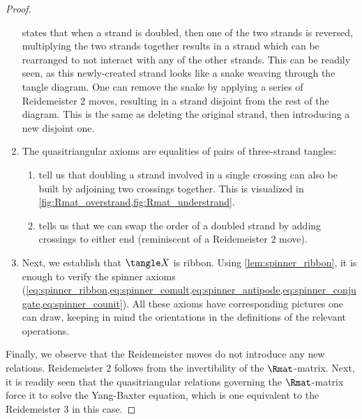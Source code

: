 \begin{proof}
\begin{enumerate}
                         states that when a strand is
                        doubled, then one of the two strands is reversed,
                        multiplying the two strands together results in a strand
                        which can be rearranged to not interact with any of the
                        other strands. This can be readily seen, as this
                        newly-created strand looks like a snake weaving through
                        the tangle diagram. One can remove the snake by applying
                        a series of Reidemeister 2 moves, resulting in a strand
                        disjoint from the rest of the diagram. This is the same
                        as deleting the original strand, then introducing a new
                        disjoint one.
                \item The quasitriangular axioms are equalities of pairs of
                        three-strand tangles:
                        \begin{enumerate}
                                \item {}
                                        tell us that doubling a strand involved
                                        in a single crossing can also be built
                                        by adjoining two crossings together.
                                        This is visualized in
                                        \cref{fig:Rmat_overstrand,fig:Rmat_understrand}.
                                \item {} tells us that we can
                                        swap the order of a doubled strand by
                                        adding crossings to either end
                                        (reminiscent of a Reidemeister 2 move).
                        \end{enumerate}
                \item Next, we establish that $\tangle X$ is ribbon. Using
                        \cref{lem:spinner_ribbon}, it is enough to verify the
                        spinner axioms
                        (\cref{eq:spinner_ribbon,eq:spinner_comult,eq:spinner_antipode,eq:spinner_conjugate,eq:spinner_counit}).
                        All these axioms have corresponding pictures one can
                        draw, keeping in mind the orientations in the
                        definitions of the relevant operations.
        \end{enumerate}
        Finally, we observe that the Reidemeister moves do not introduce any new
        relations. Reidemeister $2$ follows from the invertibility of the
        $\Rmat$-matrix. Next, it is readily seen that the quasitriangular
        relations governing the $\Rmat$-matrix force it to solve the Yang-Baxter
        equation, which is one equivalent to the Reidemeister $3$ in this case.
\end{proof}

